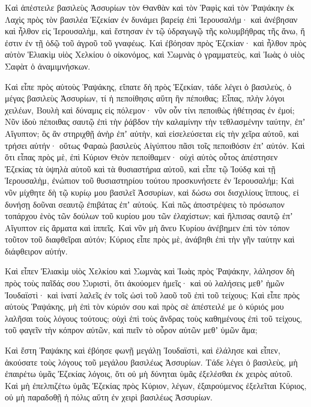 {\par }{\PP {}Καὶ ἀπέστειλε βασιλεὺς Ἀσσυρίων τὸν Θανθὰν καὶ τὸν Ῥαφὶς καὶ τὸν Ῥαψάκην ἐκ Λαχὶς πρὸς τὸν βασιλέα Ἑζεκίαν ἐν δυνάμει βαρείᾳ ἐπὶ Ἱερουσαλήμ· καὶ ἀνέβησαν καὶ ἦλθον εἰς Ἱερουσαλὴμ, καὶ ἔστησαν ἐν τῷ ὑδραγωγῷ τῆς κολυμβήθρας τῆς ἄνω, ἥ ἐστιν ἐν τῇ ὁδῷ τοῦ ἀγροῦ τοῦ γναφέως.
Καὶ ἐβόησαν πρὸς Ἐζεκίαν· καὶ ἦλθον πρὸς αὐτὸν Ἑλιακὶμ υἱὸς Χελκίου ὁ οἰκονόμος, καὶ Σωμνὰς ὁ γραμματεὺς, καὶ Ἰωὰς ὁ υἱὸς Σαφὰτ ὁ ἀναμιμνήσκων.
\par }{\PP {}Καὶ εἶπε πρὸς αὐτοὺς Ῥαψάκης, εἴπατε δὴ πρὸς Ἐζεκίαν, τάδε λέγει ὁ βασιλεὺς, ὁ μέγας βασιλεὺς Ἀσσυρίων, τί ἡ πεποίθησις αὕτη ἣν πέποιθας;
Εἶπας, πλὴν λόγοι χειλέων, Βουλὴ καὶ δύναμις εἰς πόλεμον· νῦν οὖν τίνι πεποιθὼς ἠθέτησας ἐν ἐμοί;
Νῦν ἰδοὺ πέποιθας σαυτῷ ἐπὶ τὴν ῥάβδον τὴν καλαμίνην τὴν τεθλασμένην ταύτην, ἐπʼ Αἴγυπτον; ὃς ἂν στηριχθῇ ἀνὴρ ἐπʼ αὐτὴν, καὶ εἰσελεύσεται εἰς τὴν χεῖρα αὐτοῦ, καὶ τρήσει αὐτήν· οὕτως Φαραὼ βασιλεὺς Αἰγύπτου πᾶσι τοῖς πεποιθόσιν ἐπʼ αὐτόν.
Καὶ ὅτι εἶπας πρὸς μὲ, ἐπὶ Κύριον Θεὸν πεποίθαμεν· οὐχὶ αὐτὸς οὗτος ἀπέστησεν Ἐζεκίας τὰ ὑψηλὰ αὐτοῦ καὶ τὰ θυσιαστήρια αὐτοῦ, καὶ εἶπε τῷ Ἰούδᾳ καὶ τῇ Ἱερουσαλὴμ, ἐνώπιον τοῦ θυσιαστηρίου τούτου προσκυνήσετε ἐν Ἰερουσαλήμ;
Καὶ νῦν μίχθητε δὴ τῷ κυρίῳ μου βασιλεῖ Ἀσσυρίων, καὶ δώσω σοι δισχιλίους ἵππους, εἰ δυνήσῃ δοῦναι σεαυτῷ ἐπιβάτας ἐπʼ αὐτούς.
Καὶ πῶς ἀποστρέψεις τὸ πρόσωπον τοπάρχου ἑνὸς τῶν δούλων τοῦ κυρίου μου τῶν ἐλαχίστων; καὶ ἤλπισας σαυτῷ ἐπʼ Αἴγυπτον εἰς ἅρματα καὶ ἱππεῖς.
Καὶ νῦν μὴ ἄνευ Κυρίου ἀνέβημεν ἐπὶ τὸν τόπον τοῦτον τοῦ διαφθεῖραι αὐτόν; Κύριος εἶπε πρὸς μὲ, ἀνάβηθι ἐπὶ τὴν γῆν ταύτην καὶ διάφθειρον αὐτήν.
\par }{\PP {}Καὶ εἶπεν Ἑλιακὶμ υἱὸς Χελκίου καὶ Σωμνὰς καὶ Ἰωὰς πρὸς Ῥαψάκην, λάλησον δὴ πρὸς τοὺς παῖδάς σου Συριστὶ, ὅτι ἀκούομεν ἡμεῖς· καὶ οὐ λαλήσεις μεθʼ ἡμῶν Ἰουδαϊστὶ· καὶ ἱνατί λαλεῖς ἐν τοῖς ὠσὶ τοῦ λαοῦ τοῦ ἐπὶ τοῦ τείχους;
Καὶ εἶπε πρὸς αὐτοὺς Ῥαψάκης, μὴ ἐπὶ τὸν κύριόν σου καὶ πρὸς σὲ ἀπέστειλέ με ὁ κύριός μου λαλῆσαι τοὺς λόγους τούτους; οὐχὶ ἐπὶ τοὺς ἄνδρας τοὺς καθημένους ἐπὶ τοῦ τείχους, τοῦ φαγεῖν τὴν κόπρον αὐτῶν, καὶ πιεῖν τὸ οὖρον αὐτῶν μεθʼ ὑμῶν ἅμα;
\par }{\PP {}Καὶ ἔστη Ῥαψάκης καὶ ἐβόησε φωνῇ μεγάλῃ Ἰουδαϊστὶ, καὶ ἐλάλησε καὶ εἶπεν, ἀκούσατε τοὺς λόγους τοῦ μεγάλου βασιλέως Ἀσσυρίων.
Τάδε λέγει ὁ βασιλεὺς, μὴ ἐπαιρέτω ὑμᾶς Ἐζεκίας λόγοις, ὅτι οὐ μὴ δύνηται ὑμᾶς ἐξελέσθαι ἐκ χειρὸς αὐτοῦ.
Καὶ μὴ ἐπελπιζέτω ὑμᾶς Ἐζεκίας πρὸς Κύριον, λέγων, ἐξαιρούμενος ἐξελεῖται Κύριος, οὐ μὴ παραδοθῇ ἡ πόλις αὕτη ἐν χειρὶ βασιλέως Ἀσσυρίων.
}
